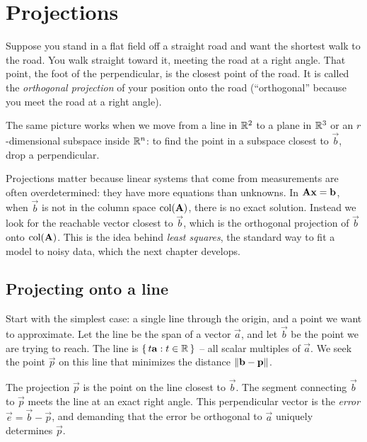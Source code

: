\chapter{Projections}

Suppose you stand in a flat field off a straight road and want the shortest walk
to the road. You walk straight toward it, meeting the road at a right angle.
That point, the foot of the perpendicular, is the closest point of the road. It is called the
\emph{orthogonal projection} of your position onto the road (``orthogonal'' because you meet the
road at a right angle).

The same picture works when we move from a line in
$\mathbb{R}^2$ to a plane in $\mathbb{R}^3$ or an $r$-dimensional subspace inside $\mathbb{R}^n$: to
find the point in a subspace closest to $\vec{b}$, drop a perpendicular.

Projections matter because linear systems that come from measurements are
often overdetermined: they have more equations than unknowns. In $\mathbf{A}\mathbf{x}=\mathbf{b}$, when
$\vec{b}$ is not in the column space $\operatorname{col}(\mathbf{A})$, there is no exact solution. Instead we look
for the reachable vector closest to $\vec{b}$, which is the orthogonal projection of $\vec{b}$ onto
$\operatorname{col}(\mathbf{A})$. This is the idea behind \emph{least squares}, the standard way to fit a model to
noisy data, which the next chapter develops.

\section{Projecting onto a line}

Start with the simplest case: a single line through the origin, and a point we
want to approximate. Let the line be the span of a vector $\vec{a}$, and let
$\vec{b}$ be the point we are trying to reach. The line is
$\{\,t\mathbf{a} : t \in \mathbb{R}\,\}$ -- all scalar multiples of $\vec{a}$. We seek
the point $\vec{p}$ on this line that minimizes the distance $\lVert\mathbf{b}-\mathbf{p}\rVert$.

\begin{intuitionbox}
The projection $\vec{p}$ is the point on the line closest to $\vec{b}$. The segment
connecting $\vec{b}$ to $\vec{p}$ meets the line at an exact right angle. This
perpendicular vector is the \emph{error} $\vec{e} = \vec{b} - \vec{p}$, and
demanding that the error be orthogonal to $\vec{a}$ uniquely determines $\vec{p}$.
\end{intuitionbox}

